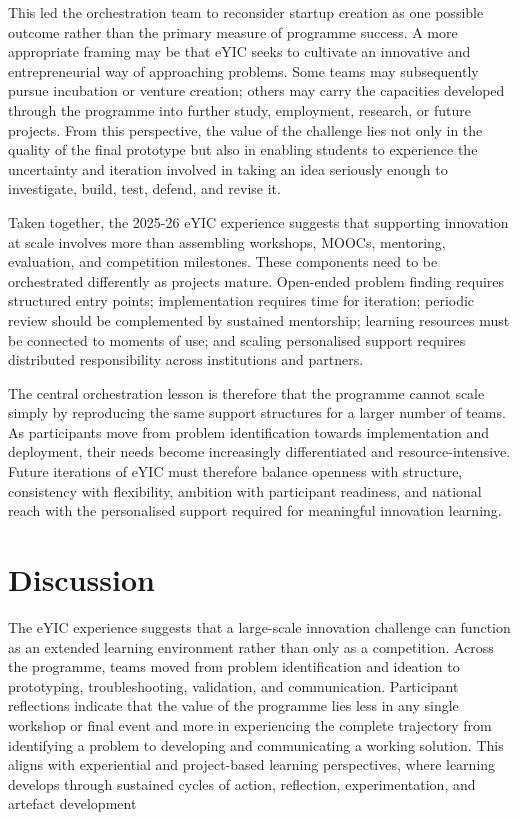 \documentclass[runningheads]{llncs}
\begin{document}
This led the orchestration team to reconsider startup creation as one possible outcome rather than the primary measure of programme success. A more appropriate framing may be that eYIC seeks to cultivate an innovative and entrepreneurial way of approaching problems. Some teams may subsequently pursue incubation or venture creation; others may carry the capacities developed through the programme into further study, employment, research, or future projects. From this perspective, the value of the challenge lies not only in the quality of the final prototype but also in enabling students to experience the uncertainty and iteration involved in taking an idea seriously enough to investigate, build, test, defend, and revise it.

Taken together, the 2025-26 eYIC experience suggests that supporting innovation at scale involves more than assembling workshops, MOOCs, mentoring, evaluation, and competition milestones. These components need to be orchestrated differently as projects mature. Open-ended problem finding requires structured entry points; implementation requires time for iteration; periodic review should be complemented by sustained mentorship; learning resources must be connected to moments of use; and scaling personalised support requires distributed responsibility across institutions and partners.

The central orchestration lesson is therefore that the programme cannot scale simply by reproducing the same support structures for a larger number of teams. As participants move from problem identification towards implementation and deployment, their needs become increasingly differentiated and resource-intensive. Future iterations of eYIC must therefore balance openness with structure, consistency with flexibility, ambition with participant readiness, and national reach with the personalised support required for meaningful innovation learning.

\section{Discussion}

The eYIC experience suggests that a large-scale innovation challenge can function as an extended learning environment rather than only as a competition. Across the programme, teams moved from problem identification and ideation to prototyping, troubleshooting, validation, and communication. Participant reflections indicate that the value of the programme lies less in any single workshop or final event and more in experiencing the complete trajectory from identifying a problem to developing and communicating a working solution. This aligns with experiential and project-based learning perspectives, where learning develops through sustained cycles of action, reflection, experimentation, and artefact development
\end{document}
